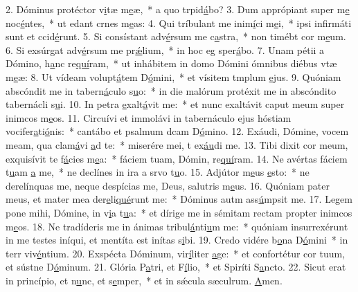 2. Dóminus protéctor v\uline{i}tæ m\uline{e}æ,~* a quo trpid\uline{á}bo?
3. Dum apprópiant super m\uline{e} noc\uline{é}ntes,~* ut edant crnes m\uline{e}as:
4. Qui tríbulant me inim\uline{í}ci m\uline{e}i,~* ipsi infirmáti sunt et ccid\uline{é}runt.
5. Si consístant adv\uline{é}rsum me c\uline{a}stra,~* non timébt cor m\uline{e}um.
6. Si exsúrgat adv\uline{é}rsum me pr\uline{ǽ}lium,~* in hoc eg sper\uline{á}bo.
7. Unam pétii a Dómino, h\uline{a}nc re\uline{quí}ram,~* ut inhábitem in domo Dómini ómnibus diébus vtæ m\uline{e}æ:
8. Ut vídeam volupt\uline{á}tem D\uline{ó}mini,~* et vísitem tmplum \uline{e}jus.
9. Quóniam abscóndit me in tabern\uline{á}culo s\uline{u}o:~* in die malórum protéxit me in abscóndito tabernácli s\uline{u}i.
10. In petra \uline{e}xalt\uline{á}vit me:~* et nunc exaltávit caput meum super inimcos m\uline{e}os.
11. Circuívi et immolávi in tabernáculo ejus hóstiam vocifer\uline{a}ti\uline{ó}nis:~* cantábo et psalmum dcam D\uline{ó}mino.
12. Exáudi, Dómine, vocem meam, qua clam\uline{á}vi \uline{a}d te:~* miserére mei, t ex\uline{áu}di me.
13. Tibi dixit cor meum, exquisívit te f\uline{á}cies m\uline{e}a:~* fáciem tuam, Dómin, re\uline{quí}ram.
14. Ne avértas fáciem t\uline{u}am \uline{a} me,~* ne declínes in ira a srvo t\uline{u}o.
15. Adjútor m\uline{e}us \uline{e}sto:~* ne derelínquas me, neque despícias me, Deus, salutris m\uline{e}us.
16. Quóniam pater meus, et mater mea der\uline{e}li\uline{qué}runt me:~* Dóminus autm ass\uline{ú}mpsit me.
17. Legem pone mihi, Dómine, in v\uline{i}a t\uline{u}a:~* et dírige me in sémitam rectam propter inimcos m\uline{e}os.
18. Ne tradíderis me in ánimas tribul\uline{á}nti\uline{u}m me:~* quóniam insurrexérunt in me testes iníqui, et mentíta est inítas s\uline{i}bi.
19. Credo vidére b\uline{o}na D\uline{ó}mini~* in terr viv\uline{é}ntium.
20. Exspécta Dóminum, vir\uline{í}liter \uline{a}ge:~* et confortétur cor tuum, et sústne D\uline{ó}minum.
21. Glória P\uline{a}tri, et F\uline{í}lio,~* et Spiríti S\uline{a}ncto.
22. Sicut erat in princípio, et n\uline{u}nc, et s\uline{e}mper,~* et in sǽcula sæculrum. \uline{A}men.

